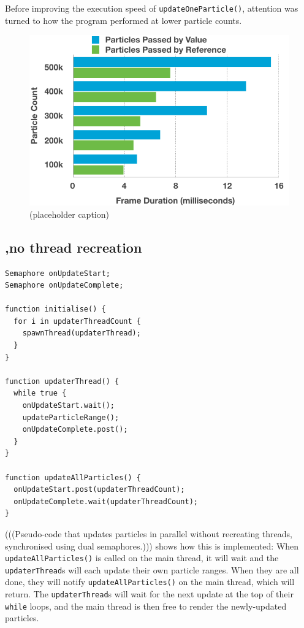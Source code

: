 \documentclass[11pt, a4paper, twocolumn]{article}
\begin{document}
Before improving the execution speed of \verb|updateOneParticle()|, attention was turned to how the program performed at lower particle counts.

\lipsum[1-1]

\begin{figure}[h]
\includegraphics[width=\linewidth]{pass-by-value-reference}
\caption{(placeholder caption)}
\label{fig:pass-by-value-reference}
\end{figure}

\subsection{,no thread recreation}

\lipsum[1-1]

\begin{verbatim}
Semaphore onUpdateStart;
Semaphore onUpdateComplete;

function initialise() {
  for i in updaterThreadCount {
    spawnThread(updaterThread);
  }
}

function updaterThread() {
  while true {
    onUpdateStart.wait();
    updateParticleRange();
    onUpdateComplete.post();
  }
}

function updateAllParticles() {
  onUpdateStart.post(updaterThreadCount);
  onUpdateComplete.wait(updaterThreadCount);
}
\end{verbatim}

(((Pseudo-code that updates particles in parallel without recreating threads, synchronised using dual semaphores.))) shows how this is implemented: When \verb|updateAllParticles()| is called on the main thread, it will wait and the \verb|updaterThread|s will each update their own particle ranges. When they are all done, they will notify \verb|updateAllParticles()| on the main thread, which will return. The \verb|updaterThread|s will wait for the next update at the top of their \verb|while| loops, and the main thread is then free to render the newly-updated particles.
\end{document}
